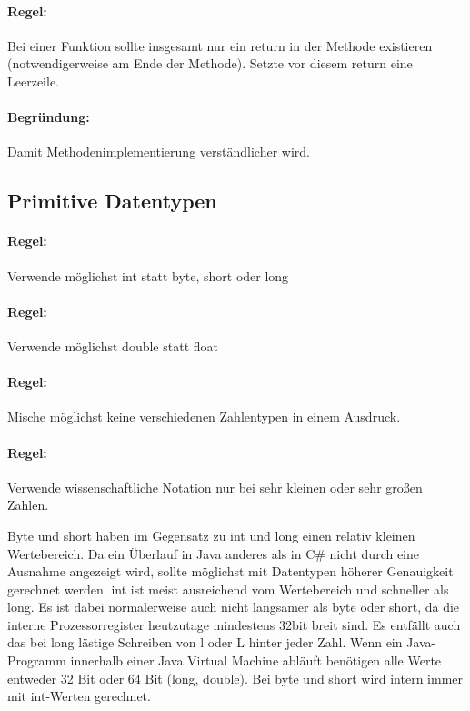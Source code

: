 \paragraph{Regel:} Bei einer Funktion sollte insgesamt nur ein return in der Methode existieren (notwendigerweise am Ende der Methode). Setzte vor diesem return eine Leerzeile.
\paragraph{Begründung:} Damit Methodenimplementierung verständlicher wird.

\subsection{Primitive Datentypen}

\paragraph{Regel:} Verwende möglichst int statt byte, short oder long
\paragraph{Regel:} Verwende möglichst double statt float
\paragraph{Regel:} Mische möglichst keine verschiedenen Zahlentypen in einem Ausdruck.
\paragraph{Regel:} Verwende wissenschaftliche Notation nur bei sehr kleinen oder sehr großen Zahlen.

Byte und short haben im Gegensatz zu int und long einen relativ kleinen Wertebereich. Da ein Überlauf in Java anderes als in C\# nicht durch eine Ausnahme angezeigt wird, sollte möglichst mit Datentypen höherer Genauigkeit gerechnet werden. int ist meist ausreichend vom Wertebereich und schneller als long. Es ist dabei normalerweise auch nicht langsamer als byte oder short, da die interne Prozessorregister heutzutage mindestens 32bit breit sind. Es entfällt auch das bei long lästige Schreiben von l oder L hinter jeder Zahl. Wenn ein Java-Programm innerhalb einer Java Virtual Machine abläuft benötigen alle Werte entweder 32 Bit oder 64 Bit (long, double). Bei byte und short wird intern immer mit int-Werten gerechnet.

